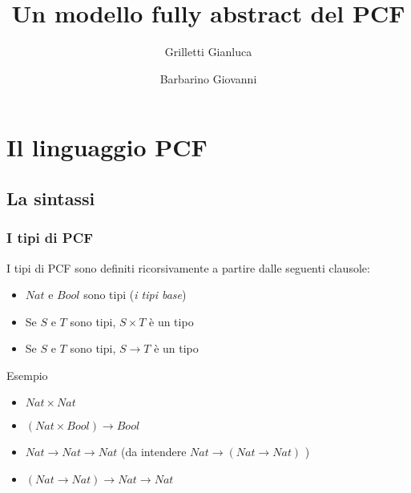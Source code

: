 \documentclass{beamer}
\title{Un modello fully abstract del PCF}
\author{Grilletti Gianluca \and Barbarino Giovanni}
\institute[Unipi]{Università di Pisa}
\begin{document}
\small


\section{Il linguaggio PCF}
\subsection{La sintassi}

\begin{frame}
	\maketitle
	
\end{frame}


\begin{frame}
	\frametitle{I tipi di PCF}
	
	I tipi di PCF sono definiti ricorsivamente a partire dalle seguenti clausole:
	\begin{itemize}
		\item $Nat$ e $Bool$ sono tipi (\emph{i tipi base})
		\item Se $S$ e $T$ sono tipi, $S\times T$ è un tipo
		\item Se $S$ e $T$ sono tipi, $S\rightarrow T$ è un tipo
	\end{itemize}
	
	\begin{block}{Esempio}
		\begin{itemize}
			\item $Nat\times Nat$
			\item $(Nat\times Bool) \rightarrow Bool$
			\item $Nat\rightarrow Nat\rightarrow Nat$ (da intendere $Nat\rightarrow (Nat\rightarrow Nat)$  )
			\item $(Nat \rightarrow Nat) \rightarrow Nat \rightarrow Nat$
		\end{itemize}

	\end{block}

	
\end{frame}
\end{document}
